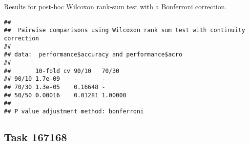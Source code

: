 \documentclass[
]{book}
\newenvironment{Shaded}{\begin{snugshade}}{\end{snugshade}}
\newcommand{\AttributeTok}[1]{\textcolor[rgb]{0.13,0.29,0.53}{#1}}
\newcommand{\ConstantTok}[1]{\textcolor[rgb]{0.56,0.35,0.01}{#1}}
\newcommand{\FunctionTok}[1]{\textcolor[rgb]{0.13,0.29,0.53}{\textbf{#1}}}
\newcommand{\NormalTok}[1]{#1}
\newcommand{\SpecialCharTok}[1]{\textcolor[rgb]{0.81,0.36,0.00}{\textbf{#1}}}
\newcommand{\StringTok}[1]{\textcolor[rgb]{0.31,0.60,0.02}{#1}}
\begin{document}
Results for post-hoc Wilcoxon rank-sum test with a Bonferroni correction.

\begin{Shaded}
\end{Shaded}

\begin{verbatim}
## 
##  Pairwise comparisons using Wilcoxon rank sum test with continuity correction 
## 
## data:  performance$accuracy and performance$acro 
## 
##       10-fold cv 90/10   70/30  
## 90/10 1.7e-09    -       -      
## 70/30 1.3e-05    0.16648 -      
## 50/50 0.00016    0.01281 1.00000
## 
## P value adjustment method: bonferroni
\end{verbatim}

\hypertarget{task-167168}{%
\subsection{Task 167168}\label{task-167168}}
\end{document}
